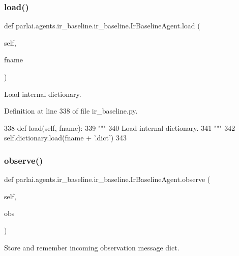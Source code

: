 \subsubsection{\texorpdfstring{load()}{load()}}
{\footnotesize\ttfamily def parlai.\+agents.\+ir\+\_\+baseline.\+ir\+\_\+baseline.\+Ir\+Baseline\+Agent.\+load (\begin{DoxyParamCaption}\item[{}]{self,  }\item[{}]{fname }\end{DoxyParamCaption})}

\begin{DoxyVerb}Load internal dictionary.
\end{DoxyVerb}
 

Definition at line 338 of file ir\+\_\+baseline.\+py.


\begin{DoxyCode}
338     \textcolor{keyword}{def }load(self, fname):
339         \textcolor{stringliteral}{"""}
340 \textcolor{stringliteral}{        Load internal dictionary.}
341 \textcolor{stringliteral}{        """}
342         self.dictionary.load(fname + \textcolor{stringliteral}{'.dict'})
343 
\end{DoxyCode}
\mbox{\label{classparlai_1_1agents_1_1ir__baseline_1_1ir__baseline_1_1IrBaselineAgent_ad5edc81f811cfdd89c8518619f5ae15a}} 
\subsubsection{\texorpdfstring{observe()}{observe()}}
{\footnotesize\ttfamily def parlai.\+agents.\+ir\+\_\+baseline.\+ir\+\_\+baseline.\+Ir\+Baseline\+Agent.\+observe (\begin{DoxyParamCaption}\item[{}]{self,  }\item[{}]{obs }\end{DoxyParamCaption})}

\begin{DoxyVerb}Store and remember incoming observation message dict.
\end{DoxyVerb}
 

